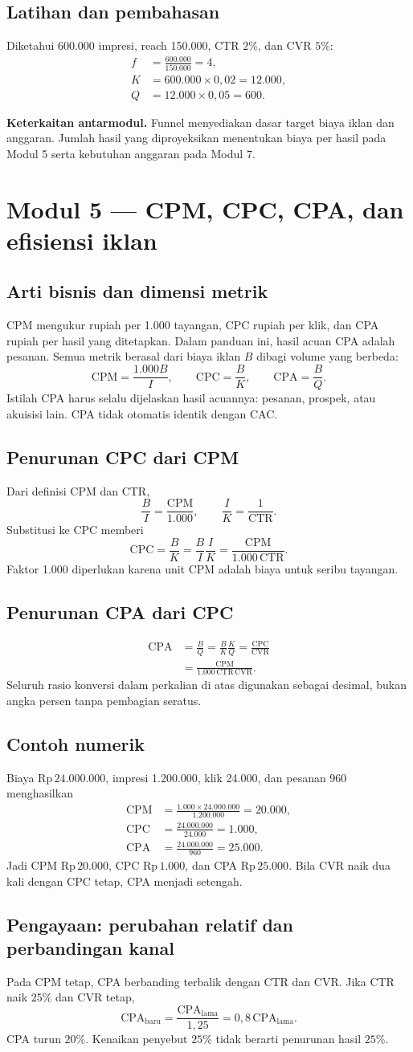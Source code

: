 \documentclass[11pt,a4paper]{article}
\newcommand{\modul}[2]{\clearpage\section{Modul #1 --- #2}}
\newcommand{\bagian}[1]{\Needspace{5\baselineskip}\subsection{#1}}
\newcommand{\jembatan}[1]{\par\textbf{Keterkaitan antarmodul.} #1\par}
\newcommand{\CTR}{\mathrm{CTR}}
\newcommand{\CVR}{\mathrm{CVR}}
\newcommand{\CPM}{\mathrm{CPM}}
\newcommand{\CPC}{\mathrm{CPC}}
\newcommand{\CPA}{\mathrm{CPA}}
\newcommand{\rp}[1]{\ensuremath{\mathrm{Rp}\,#1}}
\begin{document}
\bagian{Latihan dan pembahasan}
Diketahui 600.000 impresi, reach 150.000, CTR \(2\%\), dan CVR \(5\%\):
\[
\begin{aligned}
f&=\frac{600.000}{150.000}=4,\\
K&=600.000\times0{,}02=12.000,\\
Q&=12.000\times0{,}05=600.
\end{aligned}
\]
\jembatan{Funnel menyediakan dasar target biaya iklan dan anggaran. Jumlah hasil yang diproyeksikan menentukan biaya per hasil pada Modul 5 serta kebutuhan anggaran pada Modul 7.}

\modul{5}{CPM, CPC, CPA, dan efisiensi iklan}
\bagian{Arti bisnis dan dimensi metrik}
CPM mengukur rupiah per 1.000 tayangan, CPC rupiah per klik, dan CPA rupiah per hasil yang ditetapkan. Dalam panduan ini, hasil acuan CPA adalah pesanan. Semua metrik berasal dari biaya iklan \(B\) dibagi volume yang berbeda:
\[
\CPM=\frac{1.000B}{I},\qquad \CPC=\frac{B}{K},\qquad \CPA=\frac{B}{Q}.
\]
Istilah CPA harus selalu dijelaskan hasil acuannya: pesanan, prospek, atau akuisisi lain. CPA tidak otomatis identik dengan CAC.

\bagian{Penurunan CPC dari CPM}
Dari definisi CPM dan CTR,
\[
\frac{B}{I}=\frac{\CPM}{1.000},\qquad
\frac{I}{K}=\frac{1}{\CTR}.
\]
Substitusi ke CPC memberi
\[
\CPC=\frac{B}{K}=\frac{B}{I}\frac{I}{K}
=\frac{\CPM}{1.000\,\CTR}.
\]
Faktor 1.000 diperlukan karena unit CPM adalah biaya untuk seribu tayangan.

\bagian{Penurunan CPA dari CPC}
\[
\begin{aligned}
\CPA&=\frac{B}{Q}=\frac{B}{K}\frac{K}{Q}
=\frac{\CPC}{\CVR}\\
&=\frac{\CPM}{1.000\,\CTR\,\CVR}.
\end{aligned}
\]
Seluruh rasio konversi dalam perkalian di atas digunakan sebagai desimal, bukan angka persen tanpa pembagian seratus.

\bagian{Contoh numerik}
Biaya \rp{24.000.000}, impresi 1.200.000, klik 24.000, dan pesanan 960 menghasilkan
\[
\begin{aligned}
\CPM&=\frac{1.000\times24.000.000}{1.200.000}=20.000,\\
\CPC&=\frac{24.000.000}{24.000}=1.000,\\
\CPA&=\frac{24.000.000}{960}=25.000.
\end{aligned}
\]
Jadi CPM \rp{20.000}, CPC \rp{1.000}, dan CPA \rp{25.000}. Bila CVR naik dua kali dengan CPC tetap, CPA menjadi setengah.

\bagian{Pengayaan: perubahan relatif dan perbandingan kanal}
Pada CPM tetap, CPA berbanding terbalik dengan CTR dan CVR. Jika CTR naik \(25\%\) dan CVR tetap,
\[
\CPA_{\text{baru}}=\frac{\CPA_{\text{lama}}}{1{,}25}
=0{,}8\,\CPA_{\text{lama}}.
\]
CPA turun \(20\%\). Kenaikan penyebut \(25\%\) tidak berarti penurunan hasil \(25\%\).
\end{document}
